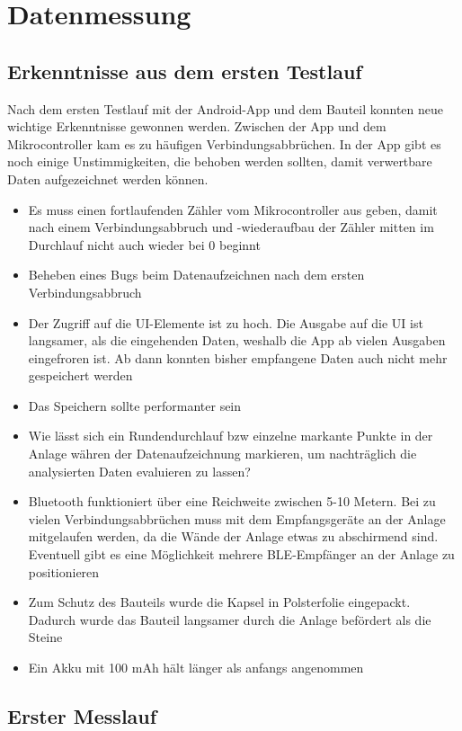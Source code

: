 \section{Datenmessung}
 
\subsection{Erkenntnisse aus dem ersten Testlauf}
Nach dem ersten Testlauf mit der Android-App und dem Bauteil konnten neue wichtige Erkenntnisse gewonnen werden.
Zwischen der App und dem Mikrocontroller kam es zu häufigen Verbindungsabbrüchen. In der App gibt es noch einige Unstimmigkeiten, die behoben werden sollten, damit verwertbare Daten aufgezeichnet werden können. 

\begin{itemize}
	\item Es muss einen fortlaufenden Zähler vom Mikrocontroller aus geben, damit nach einem Verbindungsabbruch und -wiederaufbau der Zähler mitten im Durchlauf nicht auch wieder bei 0 beginnt
	\item Beheben eines Bugs beim Datenaufzeichnen nach dem ersten Verbindungsabbruch
	\item Der Zugriff auf die UI-Elemente ist zu hoch. Die Ausgabe auf die UI ist langsamer, als die eingehenden Daten, weshalb die App ab vielen Ausgaben eingefroren ist. Ab dann konnten bisher empfangene Daten auch nicht mehr gespeichert werden
	\item Das Speichern sollte performanter sein
	\item Wie lässt sich ein Rundendurchlauf bzw einzelne markante Punkte in der Anlage währen der Datenaufzeichnung markieren, um nachträglich die analysierten Daten evaluieren zu lassen?
	\item Bluetooth funktioniert über eine Reichweite zwischen 5-10 Metern. Bei zu vielen Verbindungsabbrüchen muss mit dem Empfangsgeräte an der Anlage mitgelaufen werden, da die Wände der Anlage etwas zu abschirmend sind. Eventuell gibt es eine Möglichkeit mehrere BLE-Empfänger an der Anlage zu positionieren
	\item Zum Schutz des Bauteils wurde die Kapsel in Polsterfolie eingepackt. Dadurch wurde das Bauteil langsamer durch die Anlage befördert als die Steine
	\item Ein Akku mit 100 mAh hält länger als anfangs angenommen
\end{itemize}

\subsection{Erster Messlauf}

